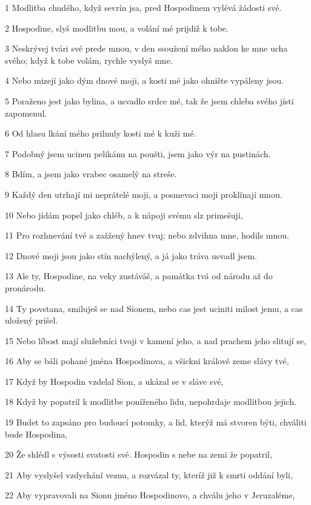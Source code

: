 \par 1 Modlitba chudého, když sevrín jsa, pred Hospodinem vylévá žádosti své.
\par 2 Hospodine, slyš modlitbu mou, a volání mé prijdiž k tobe.
\par 3 Neskrývej tvári své prede mnou, v den ssoužení mého naklon ke mne ucha svého; když k tobe volám, rychle vyslyš mne.
\par 4 Nebo mizejí jako dým dnové moji, a kosti mé jako ohnište vypáleny jsou.
\par 5 Poraženo jest jako bylina, a usvadlo srdce mé, tak že jsem chleba svého jísti zapomenul.
\par 6 Od hlasu lkání mého prilnuly kosti mé k kuži mé.
\par 7 Podobný jsem ucinen pelikánu na poušti, jsem jako výr na pustinách.
\par 8 Bdím, a jsem jako vrabec osamelý na streše.
\par 9 Každý den utrhají mi neprátelé moji, a posmevaci moji proklínají mnou.
\par 10 Nebo jídám popel jako chléb, a k nápoji svému slz primešuji,
\par 11 Pro rozhnevání tvé a zažžený hnev tvuj; nebo zdvihna mne, hodils mnou.
\par 12 Dnové moji jsou jako stín nachýlený, a já jako tráva usvadl jsem.
\par 13 Ale ty, Hospodine, na veky zustáváš, a památka tvá od národu až do pronárodu.
\par 14 Ty povstana, smiluješ se nad Sionem, nebo cas jest uciniti milost jemu, a cas uložený prišel.
\par 15 Nebo líbost mají služebníci tvoji v kamení jeho, a nad prachem jeho slitují se,
\par 16 Aby se báli pohané jména Hospodinova, a všickni králové zeme slávy tvé,
\par 17 Když by Hospodin vzdelal Sion, a ukázal se v sláve své,
\par 18 Když by popatril k modlitbe poníženého lidu, nepohrdaje modlitbou jejich.
\par 19 Budet to zapsáno pro budoucí potomky, a lid, kterýž má stvoren býti, chváliti bude Hospodina,
\par 20 Že shlédl s výsosti svatosti své. Hospodin s nebe na zemi že popatril,
\par 21 Aby vyslyšel vzdychání veznu, a rozvázal ty, kteríž již k smrti oddání byli,
\par 22 Aby vypravovali na Sionu jméno Hospodinovo, a chválu jeho v Jeruzaléme,
